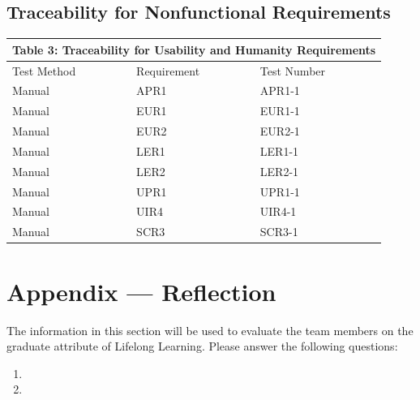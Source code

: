 \documentclass[12pt, titlepage]{article}
\begin{document}
\subsection{Traceability for Nonfunctional Requirements}

\begin{tabular}{|p{}|p{}|p{}|}

\hline \multicolumn{3}{|c|}{Table 3: Traceability for Usability and Humanity Requirements}\\

\hline Test Method&Requirement&Test Number\\

\hline Manual&APR1&APR1-1\\

\hline Manual&EUR1&EUR1-1\\

\hline Manual&EUR2&EUR2-1\\

\hline Manual&LER1&LER1-1\\

\hline Manual&LER2&LER2-1\\

\hline Manual&UPR1&UPR1-1\\

\hline Manual&UIR4&UIR4-1\\

\hline Manual&SCR3&SCR3-1\\

\hline

\end{tabular}




\newpage{}
\section*{Appendix --- Reflection}

The information in this section will be used to evaluate the team members on the
graduate attribute of Lifelong Learning.  Please answer the following questions:

\begin{enumerate}
  \item 
  \item 
\end{enumerate}
\end{document}

